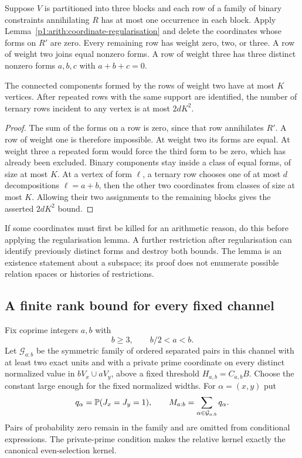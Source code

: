 \begin{corollary}
\label{p1:arith:ternary-degree}
Suppose \(V\) is partitioned into three blocks and each row of a family
of binary constraints annihilating \(R\) has at most one occurrence in
each block.  Apply Lemma~\ref{p1:arith:coordinate-regularisation} and
delete the coordinates whose forms on \(R'\) are zero.
Every remaining row has weight zero, two, or three.
A row of weight two joins equal nonzero forms.
A row of weight three has three distinct nonzero forms \(a,b,c\) with
\(a+b+c=0\).

The connected components formed by the rows of weight two have at most
\(K\) vertices.  After repeated rows with the same support are identified,
the number of ternary rows incident to any vertex is at most \(2dK^2\).
\end{corollary}

\begin{proof}
The sum of the forms on a row is zero, since that row annihilates \(R'\).
A row of weight one is therefore impossible.  At weight two its forms
are equal.  At weight three a repeated form would force the third form
to be zero, which has already been excluded.
Binary components stay inside a class of equal forms, of size at most
\(K\).  At a vertex of form \(\ell\), a ternary row chooses one of at
most \(d\) decompositions \(\ell=a+b\), then the other two coordinates
from classes of size at most \(K\).  Allowing their two assignments to
the remaining blocks gives the asserted \(2dK^2\) bound.
\end{proof}

\begin{remark}
If some coordinates must first be killed for an arithmetic reason, do
this before applying the regularisation lemma.  A further restriction
after regularisation can identify previously distinct forms and destroy
both bounds.  The lemma is an existence statement about a subspace;
its proof does not enumerate possible relation spaces or histories of
restrictions.
\end{remark}

\subsection{A finite rank bound for every fixed channel}

Fix coprime integers \(a,b\) with
\[
 b\geq3,\qquad b/2<a<b.
\]
Let \(\mathcal G_{a:b}\) be the symmetric family of ordered separated
pairs in this channel with at least two exact units and with a private
prime coordinate on every distinct normalized value in
\(bV_x\cup aV_y\), above a fixed threshold \(H_{a,b}=C_{a,b}B\).
Choose the constant large enough for the fixed normalized widths.
For \(\alpha=(x,y)\) put
\[
 q_\alpha=\P(J_x=J_y=1),\qquad
 M_{a:b}=\sum_{\alpha\in\mathcal G_{a:b}}q_\alpha.
\]
Pairs of probability zero remain in the family and are omitted from
conditional expressions.  The private-prime condition makes the
relative kernel exactly the canonical even-selection kernel.

